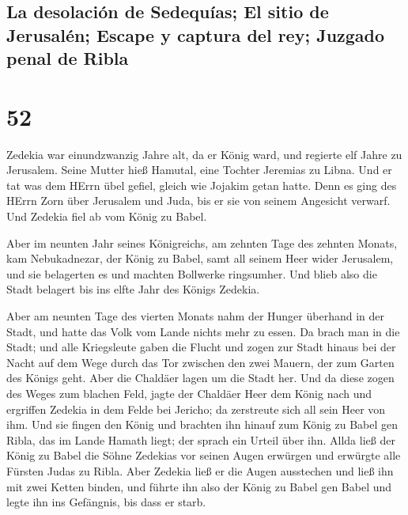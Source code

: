 \hypertarget{la-desolaciuxf3n-de-sedequuxedas-el-sitio-de-jerusaluxe9n-escape-y-captura-del-rey-juzgado-penal-de-ribla}{%
\subsection{La desolación de Sedequías; El sitio de Jerusalén; Escape y
captura del rey; Juzgado penal de
Ribla}\label{la-desolaciuxf3n-de-sedequuxedas-el-sitio-de-jerusaluxe9n-escape-y-captura-del-rey-juzgado-penal-de-ribla}}

\hypertarget{section-51}{%
\section{52}\label{section-51}}

 Zedekia war einundzwanzig Jahre alt, da er König ward,
und regierte elf Jahre zu Jerusalem. Seine Mutter hieß Hamutal, eine
Tochter Jeremias zu Libna.  Und er tat was dem HErrn übel
gefiel, gleich wie Jojakim getan hatte.  Denn es ging des
HErrn Zorn über Jerusalem und Juda, bis er sie von seinem Angesicht
verwarf. Und Zedekia fiel ab vom König zu Babel.

 Aber im neunten Jahr seines Königreichs, am zehnten Tage
des zehnten Monats, kam Nebukadnezar, der König zu Babel, samt all
seinem Heer wider Jerusalem, und sie belagerten es und machten Bollwerke
ringsumher.  Und blieb also die Stadt belagert bis ins
elfte Jahr des Königs Zedekia.

 Aber am neunten Tage des vierten Monats nahm der Hunger
überhand in der Stadt, und hatte das Volk vom Lande nichts mehr zu
essen.  Da brach man in die Stadt; und alle Kriegsleute
gaben die Flucht und zogen zur Stadt hinaus bei der Nacht auf dem Wege
durch das Tor zwischen den zwei Mauern, der zum Garten des Königs geht.
Aber die Chaldäer lagen um die Stadt her.  Und da diese
zogen des Weges zum blachen Feld, jagte der Chaldäer Heer dem König nach
und ergriffen Zedekia in dem Felde bei Jericho; da zerstreute sich all
sein Heer von ihm.  Und sie fingen den König und brachten
ihn hinauf zum König zu Babel gen Ribla, das im Lande Hamath liegt; der
sprach ein Urteil über ihn.  Allda ließ der König zu
Babel die Söhne Zedekias vor seinen Augen erwürgen und erwürgte alle
Fürsten Judas zu Ribla.  Aber Zedekia ließ er die Augen
ausstechen und ließ ihn mit zwei Ketten binden, und führte ihn also der
König zu Babel gen Babel und legte ihn ins Gefängnis, bis dass er starb.

